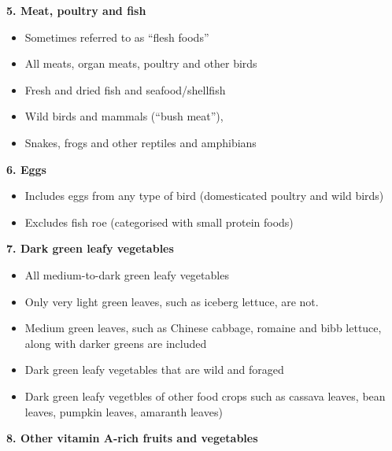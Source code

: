 \documentclass[12pt,]{book}
\providecommand{\tightlist}{%
  \setlength{\itemsep}{0pt}\setlength{\parskip}{0pt}}
\theoremstyle{definition}
\theoremstyle{definition}
\theoremstyle{definition}
\theoremstyle{remark}
\begin{document}
\textbf{5. Meat, poultry and fish}

\begin{itemize}
\tightlist
\item
  Sometimes referred to as ``flesh foods''
\item
  All meats, organ meats, poultry and other birds
\item
  Fresh and dried fish and seafood/shellfish
\item
  Wild birds and mammals (``bush meat''),
\item
  Snakes, frogs and other reptiles and amphibians
\end{itemize}

\textbf{6. Eggs}

\begin{itemize}
\tightlist
\item
  Includes eggs from any type of bird (domesticated poultry and wild
  birds)
\item
  Excludes fish roe (categorised with small protein foods)
\end{itemize}

\textbf{7. Dark green leafy vegetables}

\begin{itemize}
\tightlist
\item
  All medium-to-dark green leafy vegetables
\item
  Only very light green leaves, such as iceberg lettuce, are not.
\item
  Medium green leaves, such as Chinese cabbage, romaine and bibb
  lettuce, along with darker greens are included
\item
  Dark green leafy vegetables that are wild and foraged
\item
  Dark green leafy vegetbles of other food crops such as cassava leaves,
  bean leaves, pumpkin leaves, amaranth leaves)
\end{itemize}

\textbf{8. Other vitamin A-rich fruits and vegetables}
\end{document}
